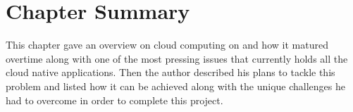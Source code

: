 \section{Chapter Summary}

This chapter gave an overview on cloud computing on and how it matured overtime along with one of the most pressing issues that currently holds all the cloud native applications. Then the author described his plans to tackle this problem and listed how it can be achieved along with the unique challenges he had to overcome in order to complete this project.

